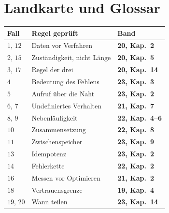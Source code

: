 \chapter{Landkarte und Glossar}

\begin{merksatz}
\begin{center}
{\small
\renewcommand{\arraystretch}{1.42}
\begin{tabular}{@{}P{1.0cm}P{3.6cm}P{4.0cm}@{}}
\toprule
\textbf{Fall} & \textbf{Regel geprüft} & \textbf{Band}\\
\midrule
$1$, $12$ & Daten vor Verfahren & \textbf{20, Kap.~2}\\
$2$, $15$ & Zuständigkeit, nicht Länge & \textbf{20, Kap.~5}\\
$3$, $17$ & Regel der drei & \textbf{20, Kap.~14}\\
$4$ & Bedeutung des Fehlens & \textbf{23, Kap.~3}\\
$5$ & Aufruf über die Naht & \textbf{23, Kap.~2}\\
$6$, $7$ & Undefiniertes Verhalten & \textbf{21, Kap.~7}\\
$8$, $9$ & Nebenläufigkeit & \textbf{22, Kap.~4--6}\\
$10$ & Zusammensetzung & \textbf{22, Kap.~8}\\
$11$ & Zwischenspeicher & \textbf{23, Kap.~9}\\
$13$ & Idempotenz & \textbf{23, Kap.~2}\\
$14$ & Fehlerkette & \textbf{22, Kap.~2}\\
$16$ & Messen vor Optimieren & \textbf{21, Kap.~2}\\
$18$ & Vertrauensgrenze & \textbf{19, Kap.~4}\\
$19$, $20$ & Wann teilen & \textbf{23, Kap.~14}\\
\bottomrule
\end{tabular}}
\end{center}

\begin{center}
\end{center}
\end{merksatz}

